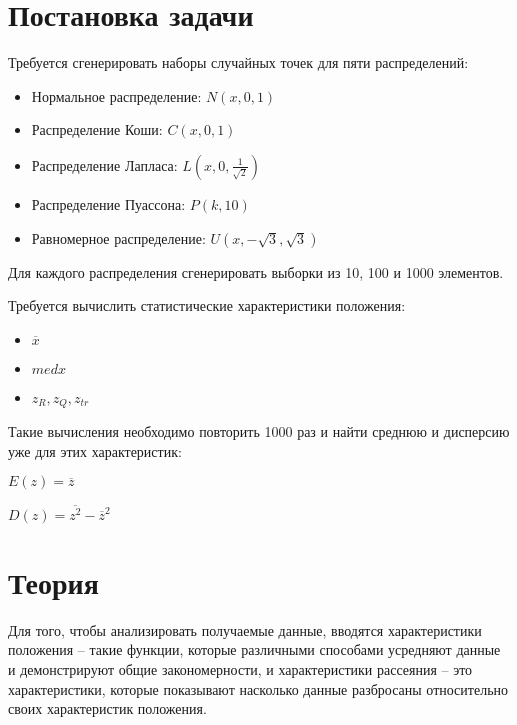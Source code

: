 \section{Постановка задачи}
Требуется сгенерировать наборы случайных точек для пяти распределений:
\begin{itemize}
\item Нормальное распределение: $N(x, 0, 1)$
\item Распределение Коши: $C(x, 0, 1)$
\item Распределение Лапласа: $L(x, 0, \frac{1}{\sqrt{2}})$
\item Распределение Пуассона: $P(k, 10)$
\item Равномерное распределение: $U(x, -\sqrt{3}, \sqrt{3})$
\end{itemize}

Для каждого распределения сгенерировать выборки из 10, 100 и 1000 элементов. 

Требуется вычислить статистические характеристики положения:
\begin{itemize}
	\item $\overline{x}$
	\item $med x$
	\item $z_R, z_Q, z_{tr}$
\end{itemize}

Такие вычисления необходимо повторить 1000 раз и найти среднюю и дисперсию уже для этих характеристик:

$E(z)=\overline{z}$

$D(z)=\overline{z^2}-\overline{z}^2$

\section{Теория}

Для того, чтобы анализировать получаемые данные, вводятся характеристики положения -- такие функции, которые различными способами усредняют данные и демонстрируют общие закономерности, и характеристики рассеяния -- это характеристики, которые показывают насколько данные разбросаны относительно своих характеристик положения.

